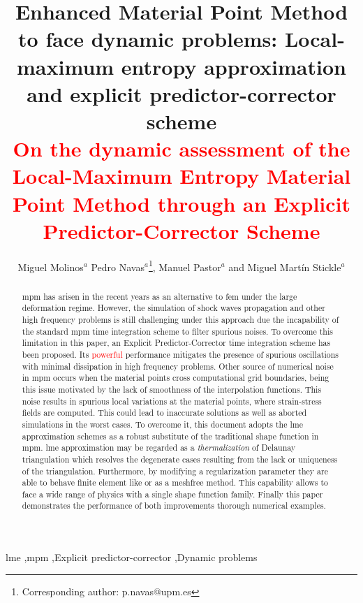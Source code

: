 \documentclass[preprint,12pt,a4paper]{elsarticle}
\newcommand{\PNA}[1]{
  \textcolor{red}{{#1}}
}
\begin{document}
\begin{frontmatter}

\title{Enhanced Material Point Method to face
  dynamic problems: Local-maximum entropy approximation and explicit
  predictor-corrector scheme\\
  \PNA{On the dynamic assessment of the Local-Maximum Entropy Material Point Method through an Explicit Predictor-Corrector Scheme}}

\author{
Miguel Molinos$^a$
Pedro Navas$^a$\footnote{Corresponding author: p.navas@upm.es},
Manuel Pastor$^a$
and Miguel Martín Stickle$^a$ 
}
\address{
  $^a$ ETSI Caminos, Canales y Puertos, Universidad Polit\'ectnica de Madrid.\\ c. Prof. Aranguren 3, 28040 Madrid, Spain
}

\begin{abstract}
  \acrfull{mpm} has arisen in the recent years as an
  alternative to \acrfull{fem} under the large
  deformation regime. However, the simulation of shock waves
  propagation and other high frequency problems is still challenging
  under this approach due the incapability of the standard \acrshort{mpm} time
  integration scheme to filter spurious noises. To overcome this
  limitation in this paper, an Explicit Predictor-Corrector time
  integration scheme has been proposed. Its \textcolor{red}{powerful}
  performance mitigates the presence of spurious oscillations with
  minimal dissipation in high frequency problems. Other source of
  numerical noise in \acrshort{mpm} occurs when the material points
  cross computational grid boundaries, being this issue motivated by
  the lack of smoothness of the interpolation functions. This noise
  results in spurious local variations at the material points, where
  strain-stress fields are computed. This could lead to inaccurate
  solutions as well as aborted simulations in the worst cases. To
  overcome it, this document adopts the \acrfull{lme} approximation
  schemes as a robust substitute of the traditional shape function in
  \acrshort{mpm}. \acrshort{lme} approximation may be regarded as a
  \textit{thermalization} of Delaunay triangulation which resolves the
  degenerate cases resulting from the lack or uniqueness of the
  triangulation. Furthermore, by modifying a regularization parameter
  they are able to behave finite element like or as a meshfree
  method. This capability allows to face a wide range of physics
  with a single shape function family. Finally this paper demonstrates
  the performance of both improvements thorough numerical examples.    
\end{abstract}

\begin{keyword}
  \acrshort{lme} \sep \acrshort{mpm} \sep Explicit predictor-corrector \sep Dynamic problems
\end{keyword}

\end{frontmatter}
\end{document}

